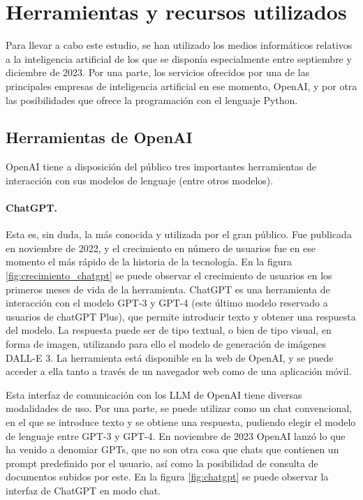 \section{Herramientas y recursos utilizados}

Para llevar a cabo este estudio, se han utilizado los medios informáticos relativos a la inteligencia artificial de los que se disponía especialmente entre septiembre y diciembre de 2023. Por una parte, los servicios ofrecidos por una de las principales empresas de inteligencia artificial en ese momento, OpenAI, y por otra las posibilidades que ofrece la programación con el lenguaje Python. 

    \subsection{Herramientas de OpenAI}

    OpenAI tiene a disposición del público tres importantes herramientas de interacción con sus modelos de lenguaje (entre otros modelos). 

        \paragraph{ChatGPT.} Esta es, sin duda, la más conocida y utilizada por el gran público. Fue publicada en noviembre de 2022, y el crecimiento en número de usuarios fue en ese momento el más rápido de la historia de la tecnología. En la figura \ref{fig:crecimiento_chatgpt} se puede observar el crecimiento de usuarios en los primeros meses de vida de la herramienta. ChatGPT es una herramienta de interacción con el modelo GPT-3 y GPT-4 (este último modelo reservado a usuarios de chatGPT Plus), que permite introducir texto y obtener una respuesta del modelo. La respuesta puede ser de tipo textual, o bien de tipo visual, en forma de imagen, utilizando para ello el modelo de generación de imágenes DALL-E 3. La herramienta está disponible en la web de OpenAI, y se puede acceder a ella tanto a través de un navegador web como de una aplicación móvil.

        Esta interfaz de comunicación con los LLM de OpenAI tiene diversas modalidades de uso. Por una parte, se puede utilizar como un chat convencional, en el que se introduce texto y se obtiene una respuesta, pudiendo elegir el modelo de lenguaje entre GPT-3 y GPT-4. En noviembre de 2023 OpenAI lanzó lo que ha venido a denomiar GPTs, que no son otra cosa que chats que contienen un prompt predefinido por el usuario, así como la posibilidad de consulta de documentos subidos por este. En la figura \ref{fig:chatgpt} se puede observar la interfaz de ChatGPT en modo chat.

